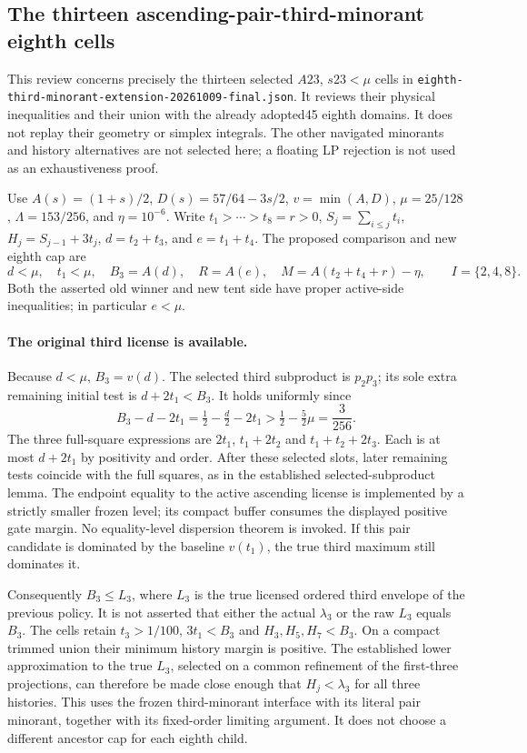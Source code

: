 \subsection{The thirteen ascending-pair-third-minorant eighth cells}
\label{sec:eighth-third-minorant-analytic-review-20261009}

This review concerns precisely the thirteen selected $A23$, $s23<\mu$
cells in \texttt{eighth-third-minorant-extension-20261009-final.json}.
It reviews their physical inequalities and their union with the already
adopted45 eighth domains. It does not replay their geometry or
simplex integrals. The other navigated minorants and history alternatives
are not selected here; a floating LP rejection is not used as an
exhaustiveness proof.

Use $A(s)=(1+s)/2$, $D(s)=57/64-3s/2$, $v=\min(A,D)$,
$\mu=25/128$, $\Lambda=153/256$, and $\eta=10^{-6}$.
Write $t_1>\cdots>t_8=r>0$, $S_j=\sum_{i\le j}t_i$,
$H_j=S_{j-1}+3t_j$, $d=t_2+t_3$, and $e=t_1+t_4$.
The proposed comparison and new eighth cap are
\[
 d<\mu,\quad t_1<\mu,\quad B_3=A(d),\quad
 R=A(e),\quad M=A(t_2+t_4+r)-\eta,
 \qquad I=\{2,4,8\}.
\]
Both the asserted old winner and new tent side have proper active-side
inequalities; in particular $e<\mu$.

\paragraph{The original third license is available.}
Because $d<\mu$, $B_3=v(d)$. The selected third subproduct is
$p_2p_3$; its sole extra remaining initial test is $d+2t_1<B_3$.
It holds uniformly since
\[
 B_3-d-2t_1=\tfrac12-\tfrac d2-2t_1
 >\tfrac12-\tfrac52\mu=\frac3{256}.
\]
The three full-square expressions are $2t_1$, $t_1+2t_2$ and
$t_1+t_2+2t_3$. Each is at most $d+2t_1$ by positivity and order.
After these selected slots, later remaining tests coincide with the
full squares, as in the established selected-subproduct lemma.
The endpoint equality to the active ascending license is implemented
by a strictly smaller frozen level; its compact buffer consumes the
displayed positive gate margin. No equality-level dispersion theorem
is invoked. If this pair candidate is dominated by the baseline
$v(t_1)$, the true third maximum still dominates it.

Consequently $B_3\le L_3$, where $L_3$ is the true licensed ordered
third envelope of the previous policy. It is not asserted that either
the actual $\lambda_3$ or the raw $L_3$ equals $B_3$.
The cells retain $t_3>1/100$, $3t_1<B_3$ and
$H_3,H_5,H_7<B_3$. On a compact trimmed union their minimum history
margin is positive. The established lower approximation to the true
$L_3$, selected on a common refinement of the first-three projections,
can therefore be made close enough that $H_j<\lambda_3$ for all three
histories. This uses the frozen third-minorant interface with its
literal pair minorant, together with its fixed-order limiting argument.
It does not choose a different ancestor cap for each eighth child.

